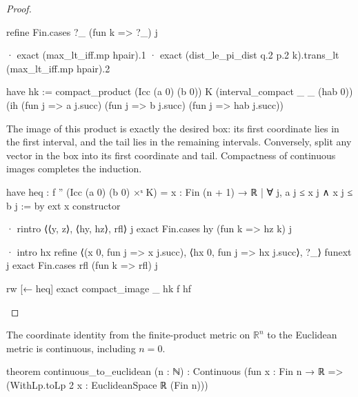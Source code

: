 \begin{proof}
\begin{lean}
        refine Fin.cases ?_ (fun k => ?_) j

        · exact (max_lt_iff.mp hpair).1
        · exact (dist_le_pi_dist q.2 p.2 k).trans_lt (max_lt_iff.mp hpair).2

      have hk := compact_product (Icc (a 0) (b 0)) K (interval_compact _ _ (hab 0))
        (ih (fun j => a j.succ) (fun j => b j.succ) (fun j => hab j.succ))
  \end{lean}

  The image of this product is exactly the desired box: its first coordinate lies in the first
  interval, and the tail lies in the remaining intervals.
  Conversely, split any vector in the box into its first coordinate and tail.
  Compactness of continuous images completes the induction.

  \begin{lean}
    have heq : f '' (Icc (a 0) (b 0) ×ˢ K) =
        {x : Fin (n + 1) → ℝ | ∀ j, a j ≤ x j ∧ x j ≤ b j} := by
      ext x
      constructor

      · rintro ⟨⟨y, z⟩, ⟨hy, hz⟩, rfl⟩ j
        exact Fin.cases hy (fun k => hz k) j

      · intro hx
        refine ⟨(x 0, fun j => x j.succ), ⟨hx 0, fun j => hx j.succ⟩, ?_⟩
        funext j
        exact Fin.cases rfl (fun k => rfl) j

    rw [← heq]
    exact compact_image _ hk f hf
  \end{lean}

\end{proof}

\begin{lemma}
  \label{an1:lem:continuous-to-euclidean}
  The coordinate identity from the finite-product metric on $\mathbb R^n$ to the Euclidean metric
  is continuous, including $n=0$.

  \begin{lean}
    theorem continuous_to_euclidean (n : ℕ) :
        Continuous (fun x : Fin n → ℝ => (WithLp.toLp 2 x : EuclideanSpace ℝ (Fin n)))
  \end{lean}
\end{lemma}

